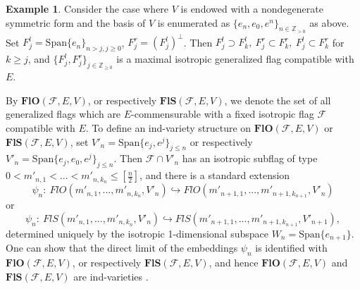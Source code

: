 \documentclass[12pt]{amsart}
\theoremstyle{definition}
\newtheorem{example}[theorem]{Example}
\begin{document}
\begin{example}\label{Example 5.2}
Consider the case where $V$ is endowed with a nondegenerate
symmetric form and the basis of $V$ is enumerated as $\{e_n,
e_0,e^n\}_{n\in\mathbb{Z}_{>0}}$ as above. Set $F^l_j=
\mathrm{Span}\{e_n\}_{n>j,j\ge0}$, $F^r_j=(F^l_j)^{\bot}$. 
Then $F^l_j\supset F^l_k,\ F^r_j\subset F^r_k,\ F^l_j\subset 
F^r_k$ for $k\ge j$, and $\{F^l_j,F^r_j\}_{j\in\mathbb{Z}
_{\ge0}}$ is  a maximal isotropic generalized flag compatible 
with $E$.
\end{example}


By $\mathbf{FlO}(\mathcal{F},E,V)$, or respectively 
$\mathbf{FlS}(\mathcal{F},E,V)$, we denote the set of all 
generalized flags which are $E$-commensurable with a fixed 
isotropic flag $\mathcal{F}$ compatible with $E$. To define an 
ind-variety structure on $\mathbf{FlO}
(\mathcal{F},E,V)$ or $\mathbf{FlS}(\mathcal{F},E,V)$, set
$V'_n=\mathrm{Span}\{e_j,e^j\}_{j\le n}$ or respectively
$V'_n=\mathrm{Span}\{e_j,e_0,e^j\}_{j\le n}$. Then 
$\mathcal{F}\cap V'_n$ has an isotropic subflag of type
$0<m'_{n,1}<...<m'_{n,k_n}\le [\frac{n}{2}]$, and there is a
standard extension
$$
\psi_n:\ FlO(m'_{n,1},...,m'_{n,k_n},V'_n)\hookrightarrow
FlO(m'_{n+1,1},...,m'_{n+1,k_{n+1}},V'_n)
$$
or
$$
\psi_n:\ FlS(m'_{n,1},...,m'_{n,k_n},V'_n)\hookrightarrow
FlS(m'_{n+1,1},...,m'_{n+1,k_{n+1}},V'_{n+1}),
$$
determined uniquely by the isotropic 1-dimensional subspace
$W_n=\mathrm{Span}\{e_{n+1}\}$. One can show that the direct
limit of the embeddings $\psi_n$ is identified with
$\mathbf{FlO}(\mathcal{F},E,V)$, or respectively $\mathbf{FlS}
(\mathcal{F},E,V)$, and hence $\mathbf{FlO}(\mathcal{F},E,V)$ 
and $\mathbf{FlS}(\mathcal{F},E,V)$ are ind-varieties 
\cite[Prop. 5]{DP}.
\end{document}
